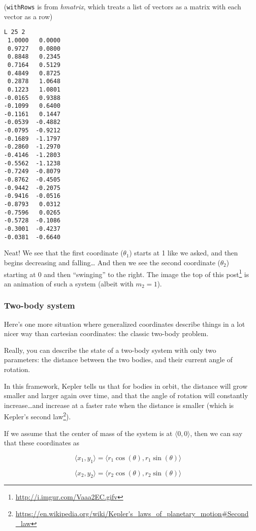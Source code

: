 \documentclass[]{article}
\renewcommand{\href}[2]{#2\footnote{\url{#1}}}
\begin{document}
(\texttt{withRows} is from \emph{hmatrix}, which treats a list of vectors as a
matrix with each vector as a row)

\begin{verbatim}
L 25 2
 1.0000   0.0000
 0.9727   0.0800
 0.8848   0.2345
 0.7164   0.5129
 0.4849   0.8725
 0.2878   1.0648
 0.1223   1.0801
-0.0165   0.9388
-0.1099   0.6400
-0.1161   0.1447
-0.0539  -0.4882
-0.0795  -0.9212
-0.1689  -1.1797
-0.2860  -1.2970
-0.4146  -1.2803
-0.5562  -1.1238
-0.7249  -0.8079
-0.8762  -0.4505
-0.9442  -0.2075
-0.9416  -0.0516
-0.8793   0.0312
-0.7596   0.0265
-0.5728  -0.1086
-0.3001  -0.4237
-0.0381  -0.6640
\end{verbatim}

Neat! We see that the first coordinate (\(\theta_1\)) starts at 1 like we asked,
and then begins decreasing and falling\ldots{} And then we see the second
coordinate (\(\theta_2\)) starting at 0 and then ``swinging'' to the right. The
\href{http://i.imgur.com/Vaaa2EC.gifv}{image the top of this post} is an
animation of such a system (albeit with \(m_2 = 1\)).

\subsubsection{Two-body system}\label{two-body-system}

Here's one more situation where generalized coordinates describe things in a lot
nicer way than cartesian coordinates: the classic two-body problem.

Really, you can describe the state of a two-body system with only two
parameters: the distance between the two bodies, and their current angle of
rotation.

In this framework, Kepler tells us that for bodies in orbit, the distance will
grow smaller and larger again over time, and that the angle of rotation will
constantly increase\ldots{}and increase at a faster rate when the distance is
smaller (which is
\href{https://en.wikipedia.org/wiki/Kepler's_laws_of_planetary_motion\#Second_law}{Kepler's
second law}).

If we assume that the center of mass of the system is at
\(\langle 0, 0 \rangle\), then we can say that these coordinates as

\[
\langle x_1, y_1 \rangle = \langle r_1 \cos (\theta), r_1 \sin (\theta) \rangle
\]

\[
\langle x_2, y_2 \rangle = \langle r_2 \cos (\theta), r_2 \sin (\theta) \rangle
\]
\end{document}
